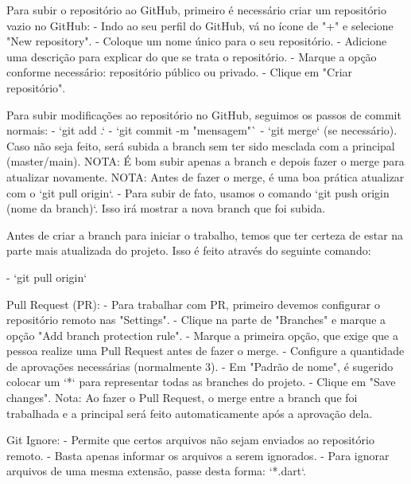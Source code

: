 Para subir o repositório ao GitHub, primeiro é necessário criar um repositório vazio no GitHub:
 - Indo ao seu perfil do GitHub, vá no ícone de "+" e selecione "New repository".
 - Coloque um nome único para o seu repositório.
 - Adicione uma descrição para explicar do que se trata o repositório.
 - Marque a opção conforme necessário: repositório público ou privado.
 - Clique em "Criar repositório".

Para subir modificações ao repositório no GitHub, seguimos os passos de commit normais:
    - `git add .`
    - `git commit -m "mensagem"`
    - `git merge` (se necessário). Caso não seja feito, será subida a branch sem ter sido mesclada com a principal (master/main).
    NOTA: É bom subir apenas a branch e depois fazer o merge para atualizar novamente.
    NOTA: Antes de fazer o merge, é uma boa prática atualizar com o `git pull origin`.
    - Para subir de fato, usamos o comando `git push origin (nome da branch)`.
    Isso irá mostrar a nova branch que foi subida.

Antes de criar a branch para iniciar o trabalho, temos que ter certeza de estar na parte
mais atualizada do projeto. Isso é feito através do seguinte comando:

   - `git pull origin`

Pull Request (PR):
   - Para trabalhar com PR, primeiro devemos configurar o repositório remoto nas "Settings".
   - Clique na parte de "Branches" e marque a opção "Add branch protection rule".
   - Marque a primeira opção, que exige que a pessoa realize uma Pull Request antes de fazer o merge.
   - Configure a quantidade de aprovações necessárias (normalmente 3).
   - Em "Padrão de nome", é sugerido colocar um `*` para representar todas as branches do projeto.
   - Clique em "Save changes".
   Nota: Ao fazer o Pull Request, o merge entre a branch que foi trabalhada e a principal será feito automaticamente
   após a aprovação dela.

Git Ignore:
   - Permite que certos arquivos não sejam enviados ao repositório remoto.
   - Basta apenas informar os arquivos a serem ignorados.
   - Para ignorar arquivos de uma mesma extensão, passe desta forma: `*.dart`.